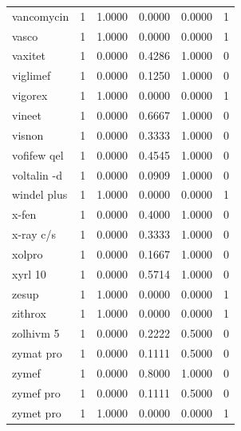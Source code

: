 \begin{longtable}{p{3.0cm}rrrrr}
vancomycin & 1 & 1.0000 & 0.0000 & 0.0000 & 1 \\
vasco & 1 & 1.0000 & 0.0000 & 0.0000 & 1 \\
vaxitet & 1 & 0.0000 & 0.4286 & 1.0000 & 0 \\
viglimef & 1 & 0.0000 & 0.1250 & 1.0000 & 0 \\
vigorex & 1 & 1.0000 & 0.0000 & 0.0000 & 1 \\
vineet & 1 & 0.0000 & 0.6667 & 1.0000 & 0 \\
visnon & 1 & 0.0000 & 0.3333 & 1.0000 & 0 \\
vofifew qel & 1 & 0.0000 & 0.4545 & 1.0000 & 0 \\
voltalin -d & 1 & 0.0000 & 0.0909 & 1.0000 & 0 \\
windel plus & 1 & 1.0000 & 0.0000 & 0.0000 & 1 \\
x-fen & 1 & 0.0000 & 0.4000 & 1.0000 & 0 \\
x-ray c/s & 1 & 0.0000 & 0.3333 & 1.0000 & 0 \\
xolpro & 1 & 0.0000 & 0.1667 & 1.0000 & 0 \\
xyrl 10 & 1 & 0.0000 & 0.5714 & 1.0000 & 0 \\
zesup & 1 & 1.0000 & 0.0000 & 0.0000 & 1 \\
zithrox & 1 & 1.0000 & 0.0000 & 0.0000 & 1 \\
zolhivm 5 & 1 & 0.0000 & 0.2222 & 0.5000 & 0 \\
zymat pro & 1 & 0.0000 & 0.1111 & 0.5000 & 0 \\
zymef & 1 & 0.0000 & 0.8000 & 1.0000 & 0 \\
zymef pro & 1 & 0.0000 & 0.1111 & 0.5000 & 0 \\
zymet pro & 1 & 1.0000 & 0.0000 & 0.0000 & 1 \\
\end{longtable}
\endgroup
